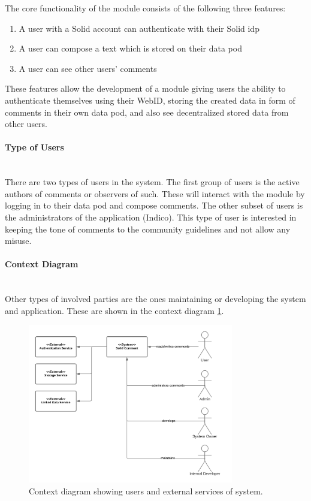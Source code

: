 The core functionality of the module consists of the following three features: 
\vspace{-3mm}
\begin{enumerate}
    \item A user with a Solid account can authenticate with their Solid \gls{idp}
    \item A user can compose a text which is stored on their data pod
    \item A user can see other users’ comments
\end{enumerate}
\vspace{-3mm}

These features allow the development of a module giving users the ability to authenticate themselves using their WebID, storing the created data in form of comments in their own data pod, and also see decentralized stored data from other users.
\vspace{0.5cm}
\paragraph{Type of Users}\mbox{}\\

There are two types of users in the system. The first group of users is the active authors of comments or observers of such. These will interact with the module by logging in to their data pod and compose comments. The other subset of users is the administrators of the application (Indico). This type of user is interested in keeping the tone of comments to the community guidelines and not allow any misuse.
\vspace{0.5cm}
\paragraph{Context Diagram}\mbox{}\\

Other types of involved parties are the ones maintaining or developing the system and application. These are shown in the context diagram \ref{fig:poc-comment-context_diagram}.

\begin{figure}[H]
    \centering
    \includegraphics[width=0.8\textwidth]{prototype/graphs/poc-comment-context_diagram.png}
    \caption{Context diagram showing users and external services of system.}
    \label{fig:poc-comment-context_diagram}
\end{figure}
\vspace{0.5cm}
